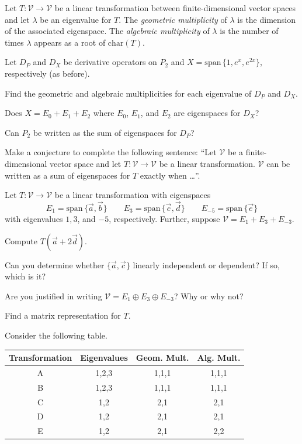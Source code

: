 \documentclass[14pt]{problemset}
\newcommand{\Span}{\mathrm{span}\,}
\newcommand{\Char}{\mathrm{char}}
\begin{document}
	\begin{definition}
		Let $T:\mathcal V\to\mathcal V$ be a linear transformation 
		between finite-dimensional vector spaces and let $\lambda$
		be an eigenvalue for $T$. The \emph{geometric multiplicity} of $\lambda$ is
		the dimension of the associated eigenspace. The \emph{algebraic multiplicity} of
		$\lambda$ is the number of times $\lambda$ appears as a root of $\Char(T)$.
	\end{definition}

	\question
	Let $D_P$ and $D_X$ be derivative operators on $P_2$ and $X=\Span\{1,e^x,e^{2x}\}$, respectively (as before).
	\begin{parts}
		\item Find the geometric and algebraic multiplicities for each eigenvalue of $D_P$ and $D_X$.
		\item Does $X=E_0+E_1+E_2$ where $E_0$, $E_1$, and $E_2$ are eigenspaces for $D_X$?
		\item Can $P_2$ be written as the sum of eigenspaces for $D_P$?
		\item Make a conjecture to complete the following sentence: 
			``Let $\mathcal V$ be a finite-dimensional vector space and let $T:\mathcal V\to\mathcal V$
			be a linear transformation. $\mathcal V$
			can be written as a sum of eigenspaces for $T$ exactly when \ldots''.
	\end{parts}

	\question
	Let $T:\mathcal V\to\mathcal V$ be a linear transformation with eigenspaces
	\[
		E_1=\Span\{\vec a,\vec b\}\qquad E_3=\Span\{\vec c,\vec d\}\qquad E_{-5}=\Span\{\vec e\}
	\]
	with eigenvalues $1,3$, and $-5$, respectively. Further, suppose $\mathcal V=E_1+E_3+E_{-3}$.
	\begin{parts}
		\item Compute $T(\vec a+2\vec d)$.
		\item Can you determine whether $\{\vec a,\vec c\}$ linearly independent or dependent?
			If so, which is it?
		\item Are you justified in writing $\mathcal V=E_1\oplus E_3\oplus E_{-3}$? Why or why not?
		\item Find a matrix representation for $T$.
	\end{parts}

	\newpage
	\question
	Consider the following table.

	\begin{tabular}{c|c|c|c}
		Transformation & Eigenvalues & Geom. Mult. & Alg. Mult. \\
		\hline
		A & 1,2,3 & 1,1,1 & 1,1,1\\
		B & 1,2,3 & 1,1,1 & 1,1,1 \\
		C & 1,2 & 2,1& 2,1\\
		D & 1,2 & 2,1& 2,1\\
		E & 1,2 & 2,1& 2,2\\
	\end{tabular}
\end{document}
